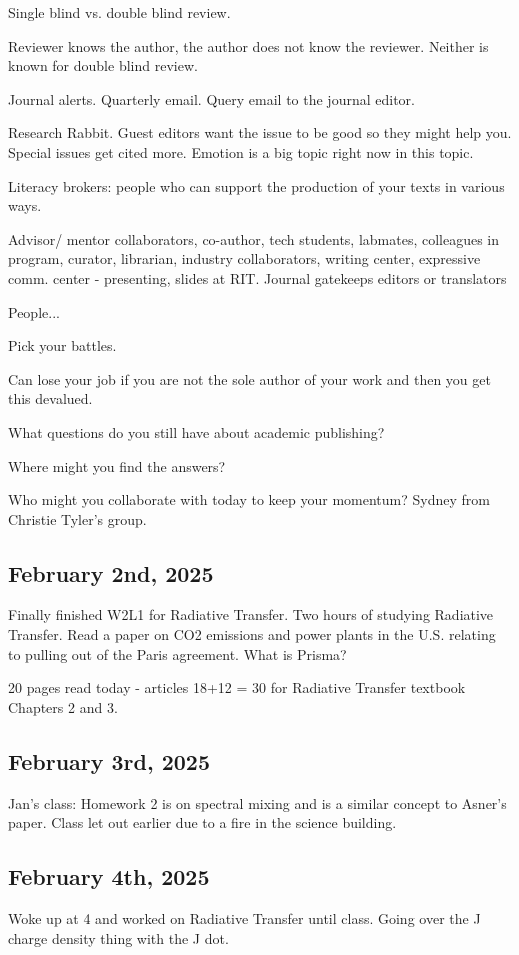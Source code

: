 \documentclass{article}
\begin{document}
Single blind vs. double blind review. 

Reviewer knows the author, the author does not know the reviewer. Neither is known for double blind review. 


Journal alerts. Quarterly email. 
Query email to the journal editor. 

Research Rabbit. 
Guest editors want the issue to be good so they might help you. Special issues get cited more. Emotion is a big topic right now in this topic. 

Literacy brokers: people who can support the production of your texts in various ways. 


Advisor/ mentor 
collaborators, co-author, tech 
students, labmates, colleagues in program, curator, librarian, industry collaborators, writing center, expressive comm. center - presenting, slides at RIT. 
Journal gatekeeps
editors or translators

People...

Pick your battles. 

Can lose your job if you are not the sole author of your work and then you get this devalued. 

What questions do you still have about academic publishing? 

Where might you find the answers? 

Who might you collaborate with today to keep your momentum? 
Sydney from Christie Tyler's group. 


\subsection{February 2nd, 2025}
Finally finished W2L1 for Radiative Transfer. Two hours of studying Radiative Transfer. Read a paper on CO2 emissions and power plants in the U.S. relating to pulling out of the Paris agreement. What is Prisma? 

20 pages read today - articles
18+12 = 30 for Radiative Transfer textbook Chapters 2 and 3. 

\subsection{February 3rd, 2025}
Jan's class: Homework 2 is on spectral mixing and is a similar concept to Asner's paper. Class let out earlier due to a fire in the science building. 

\subsection{February 4th, 2025}
Woke up at 4 and worked on Radiative Transfer until class. 
Going over the J charge density thing with the J dot. 
\end{document}
